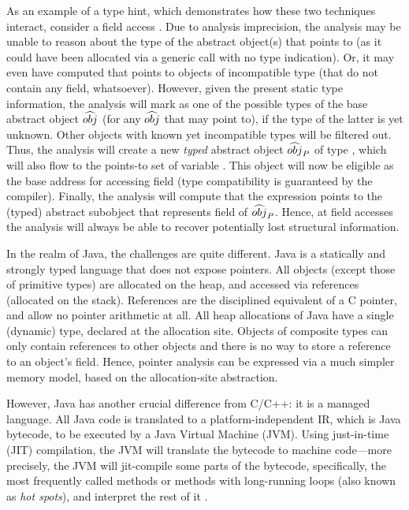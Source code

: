 As an example of a type hint, which demonstrates how these two
techniques interact, consider a field access . Due
to analysis imprecision, the analysis may be unable to reason about
the type of the abstract object(s) that  points to (as it
could have been allocated via a generic  call with no
type indication). Or, it may even have computed that  points
to objects of incompatible type (that do not contain any 
field, whatsoever). However, given the present static type
information, the analysis will mark  as one of the possible
types of the base abstract object \(\widehat{obj}\) (for any
\(\widehat{obj}\) that  may point to), if the type of the latter
is yet unknown. Other objects with known yet incompatible types will
be filtered out. Thus, the analysis will create a new \emph{typed}
abstract object \(\widehat{obj}_P\) of type , which will also
flow to the points-to set of variable . This object will now
be eligible as the base address for accessing field  (type
compatibility is guaranteed by the compiler). Finally, the analysis
will compute that the expression  points to the (typed)
abstract subobject that represents field  of
\(\widehat{obj}_P\). Hence, at field accesses the analysis will always
be able to recover potentially lost structural information.

In the realm of Java, the challenges are quite different. Java is a
statically and strongly typed language that does not expose
pointers. All objects (except those of primitive types) are allocated
on the heap, and accessed via references (allocated on the
stack). References are the disciplined equivalent of a C pointer, and
allow no pointer arithmetic at all. All heap allocations of Java have
a single (dynamic) type, declared at the allocation site. Objects of
composite types can only contain references to other objects and there
is no way to store a reference to an object's field. Hence, pointer
analysis can be expressed via a much simpler memory model, based on the
allocation-site abstraction.

However, Java has another crucial difference from C/C++: it is a
managed language. All Java code is translated to a
platform-independent IR, which is Java bytecode, to be executed by a
Java Virtual Machine (JVM). Using just-in-time (JIT) compilation, the
JVM will translate the bytecode to machine code---more precisely, the
JVM will jit-compile some parts of the bytecode, specifically, the
most frequently called methods or methods with long-running loops
(also known as \emph{hot spots}), and interpret the rest of it
\cite{journals/taco/KotzmannWMRRC08}.

